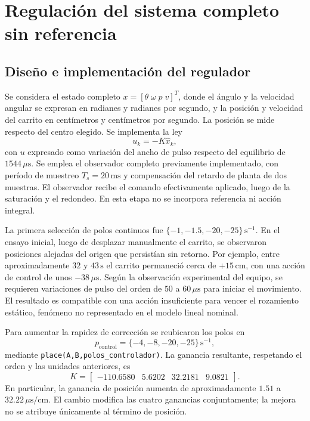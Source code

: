 \documentclass[a4paper, twoside, 10pt, spanish]{article}
\numberwithin{table}{section}
\begin{document}
\section{Regulación del sistema completo sin referencia}
\label{sec:regulacion-sin-referencia}

\subsection{Diseño e implementación del regulador}
Se considera el estado completo $x = [\theta\;\omega\;p\;v]^T$, donde el ángulo y la velocidad angular se expresan en radianes y radianes por segundo, y la posición y velocidad del carrito en centímetros y centímetros por segundo. La posición se mide respecto del centro elegido. Se implementa la ley
\begin{equation}
    u_k = -K\hat{x}_k,
\end{equation}
con $u$ expresado como variación del ancho de pulso respecto del equilibrio de $1544\,\mu\mathrm{s}$. Se emplea el observador completo previamente implementado, con período de muestreo $T_s = 20\,\mathrm{ms}$ y compensación del retardo de planta de dos muestras. El observador recibe el comando efectivamente aplicado, luego de la saturación y el redondeo. En esta etapa no se incorpora referencia ni acción integral.

La primera selección de polos continuos fue $\{-1,-1.5,-20,-25\}\,\mathrm{s}^{-1}$. En el ensayo inicial, luego de desplazar manualmente el carrito, se observaron posiciones alejadas del origen que persistían sin retorno. Por ejemplo, entre aproximadamente $32$ y $43\,\mathrm{s}$ el carrito permaneció cerca de $+15\,\mathrm{cm}$, con una acción de control de unos $-38\,\mu\mathrm{s}$. Según la observación experimental del equipo, se requieren variaciones de pulso del orden de $50$ a $60\,\mu\mathrm{s}$ para iniciar el movimiento. El resultado es compatible con una acción insuficiente para vencer el rozamiento estático, fenómeno no representado en el modelo lineal nominal.

Para aumentar la rapidez de corrección se reubicaron los polos en
\begin{equation}
    p_{\mathrm{control}} = \{-4,-8,-20,-25\}\,\mathrm{s}^{-1},
\end{equation}
mediante \texttt{place(A,B,polos\_controlador)}. La ganancia resultante, respetando el orden y las unidades anteriores, es
\begin{equation}
    K = \begin{bmatrix}
    -110.6580 & 5.6202 & 32.2181 & 9.0821
    \end{bmatrix}.
\end{equation}
En particular, la ganancia de posición aumenta de aproximadamente $1.51$ a $32.22\,\mu\mathrm{s}/\mathrm{cm}$. El cambio modifica las cuatro ganancias conjuntamente; la mejora no se atribuye únicamente al término de posición.
\end{document}
